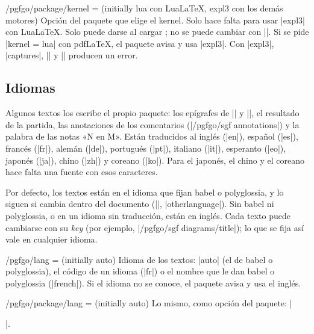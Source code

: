 \begin{goban}[9, stone = {radius = 4pt}, mark = {line = {color = red}}]
\begin{key}{/pgfgo/package/kernel =  (initially lua con Lua\LaTeX, expl3 con los demás motores)}
	Opción del paquete que elige el kernel. Solo hace falta para usar |expl3| con Lua\LaTeX. Solo puede darse al cargar \pgfgoname; no se puede cambiar con |\pgfgoset|. Si se pide |kernel = lua| con pdf\LaTeX, el paquete avisa y usa |expl3|. Con |expl3|, |captures|, || y |\sgf| producen un error.

	\begin{codeexample}
		\usepackage[kernel = expl3]{pgf-go}
	\end{codeexample}
\end{key}

\subsection{Idiomas}
\label{subsec:idiomas}

Algunos textos los escribe el propio paquete: los epígrafes de |\sgfdiagrams| y |\sgfproblem|, el resultado de la partida, las anotaciones de los comentarios (|/pgfgo/sgf annotations|) y la palabra de las notas «N en M». Están traducidos al inglés (|en|), español (|es|), francés (|fr|), alemán (|de|), portugués (|pt|), italiano (|it|), esperanto (|eo|), japonés (|ja|), chino (|zh|) y coreano (|ko|). Para el japonés, el chino y el coreano hace falta una fuente con esos caracteres.

Por defecto, los textos están en el idioma que fijan babel o polyglossia, y lo siguen si cambia dentro del documento (|\selectlanguage|, |otherlanguage|). Sin babel ni polyglossia, o en un idioma sin traducción, están en inglés. Cada texto puede cambiarse con su \emph{key} (por ejemplo, |/pgfgo/sgf diagrams/title|); lo que se fija así vale en cualquier idioma.

\begin{key}{/pgfgo/lang =  (initially auto)}
	Idioma de los textos: |auto| (el de babel o polyglossia), el código de un idioma (|fr|) o el nombre que le dan babel o polyglossia (|french|). Si el idioma no se conoce, el paquete avisa y usa el inglés.

	\begin{codeexample}
	\end{codeexample}
\end{key}

\begin{key}{/pgfgo/package/lang =  (initially auto)}
	Lo mismo, como opción del paquete: |\usepackage[lang = fr]{pgf-go}|.
\end{key}


\end{goban}
